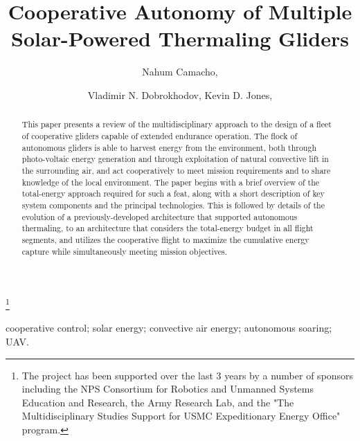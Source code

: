 \documentclass{ifacconf}
\begin{document}
\begin{frontmatter}

\title{Cooperative Autonomy of Multiple Solar-Powered Thermaling Gliders
}

\thanks[footnoteinfo]{The project has been supported over the last 3 years by a number of
sponsors including the NPS Consortium for Robotics and Unmanned Systems
Education and Research, the Army Research Lab, and the "The Multidisciplinary
Studies Support for USMC Expeditionary Energy Office" program.}

\author[First]{Nahum Camacho,}
\author[Second]{Vladimir N. Dobrokhodov, Kevin D. Jones,}

\address[First]{Graduate student at the Department of Mechanical and Aerospace Engineering,
Naval
Postgraduate School, Monterey, CA 93943 USA (e-mail: ncamacho@nps.edu)}
\address[Second]{Research Associate Professors at the Department  of Mechanical and Aerospace
Engineering, Naval Postgraduate School, Monterey, CA 93943 USA (e-mail: {vndobrok,
kdjones}@nps.edu)}


\begin{keyword}                           %
cooperative control; solar energy; convective air energy; autonomous soaring;
UAV.
\end{keyword}                             %


\begin{abstract}                          %
This paper presents a review of the multidisciplinary approach to the
design of a fleet of cooperative gliders capable of extended endurance
operation. The flock of autonomous gliders is able to harvest energy from
the environment, both through photo-voltaic energy generation and through
exploitation of natural convective lift in the surrounding air, and act
cooperatively to meet mission requirements and to share knowledge of the
local environment. The paper begins with a brief overview of the
total-energy approach required for such a feat, along with a short
description of key system components and the principal technologies. This
is followed by details of the evolution of a previously-developed
architecture that supported autonomous thermaling, to an architecture that
considers the total-energy budget in all flight segments, and utilizes the
cooperative flight to maximize the cumulative energy capture while
simultaneously meeting mission objectives.
\end{abstract}

\end{frontmatter}
\end{document}
